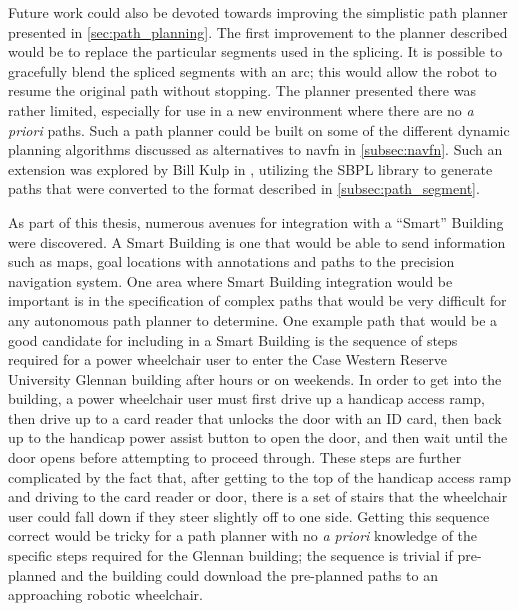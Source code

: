 Future work could also be devoted towards improving the simplistic path planner presented in \autoref{sec:path_planning}. The first improvement to the planner described would be to replace the particular segments used in the splicing. It is possible to gracefully blend the spliced segments with an arc; this would allow the robot to resume the original path without stopping. The planner presented there was rather limited, especially for use in a new environment where there are no \emph{a priori} paths. Such a path planner could be built on some of the different dynamic planning algorithms discussed as alternatives to navfn in \autoref{subsec:navfn}. Such an extension was explored by Bill Kulp in \autocite{Kulp2012}, utilizing the SBPL library \autocite{Likhachev2010} to generate paths that were converted to the format described in \autoref{subsec:path_segment}.

As part of this thesis, numerous avenues for integration with a ``Smart'' Building were discovered. A Smart Building is one that would be able to send information such as maps, goal locations with annotations and paths to the precision navigation system. One area where Smart Building integration would be important is in the specification of complex paths that would be very difficult for any autonomous path planner to determine. One example path that would be a good candidate for including in a Smart Building is the sequence of steps required for a power wheelchair user to enter the Case Western Reserve University Glennan building after hours or on weekends. In order to get into the building, a power wheelchair user must first drive up a handicap access ramp, then drive up to a card reader that unlocks the door with an ID card, then back up to the handicap power assist button to open the door, and then wait until the door opens before attempting to proceed through. These steps are further complicated by the fact that, after getting to the top of the handicap access ramp and driving to the card reader or door, there is a set of stairs that the wheelchair user could fall down if they steer slightly off to one side. Getting this sequence correct would be tricky for a path planner with no \emph{a priori} knowledge of the specific steps required for the Glennan building; the sequence is trivial if pre-planned and the building could download the pre-planned paths to an approaching robotic wheelchair.

\begin{comment}

Details possible areas to expand on this thesis and improve its performance on our wheelchair platform

Talk about things where a Smart Building can \emph{definitely} help the precision navigation out. Some are obvious such as goal annotation so that things like ``kitchen'' mean something, but others are less obvious.

One of those would be things that would be tricky, even for a good path planner, such as the approach to get into Glennan from the quad-level.

\end{comment}